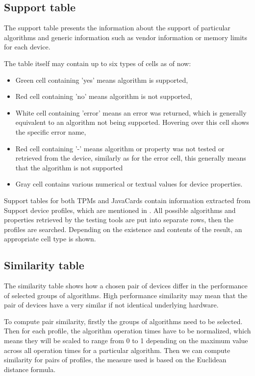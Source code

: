 \subsection{Support table}
The support table presents the information about the support of particular algorithms and generic information such as vendor information or memory limits for each device.

The table itself may contain up to six types of cells as of now:
\begin{itemize}
    \item Green cell containing 'yes' means algorithm is supported,
    \item Red cell containing 'no' means algorithm is not supported,
    \item White cell containing 'error' means an error was returned, which is generally equivalent to an algorithm not being supported. Hovering over this cell shows the specific error name,
    \item Red cell containing '-' means algorithm or property was not tested or retrieved from the device, similarly as for the error cell, this generally means that the algorithm is not supported
    \item Gray cell contains various numerical or textual values for device properties.
\end{itemize}

Support tables for both TPMs and JavaCards contain information extracted from Support device profiles, which are mentioned in . All possible algorithms and properties retrieved by the testing tools are put into separate rows, then the profiles are searched. Depending on the existence and contents of the result, an appropriate cell type is shown. 


\subsection{Similarity table}
The similarity table shows how a chosen pair of devices differ in the performance of selected groups of algorithms. High performance similarity may mean that the pair of devices have a very similar if not identical underlying hardware.

To compute pair similarity, firstly the groups of algorithms need to be selected. Then for each profile, the algorithm operation times have to be normalized, which means they will be scaled to range from 0 to 1 depending on the maximum value across all operation times for a particular algorithm. Then we can compute similarity for pairs of profiles, the measure used is based on the Euclidean distance formula.

